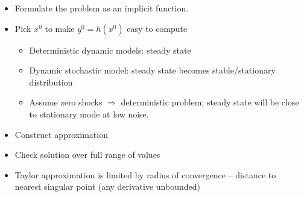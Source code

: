 \documentclass[bigger,handout]{beamer}
\newenvironment{stepitemize}{\begin{itemize}[<+->]}{\end{itemize} }
\begin{document}
\begin{frame}%
 

\begin{stepitemize}
\item Formulate the problem as an implicit function.

\item Pick $x^{0}$ to make $y^{0}=h\left( x^{0}\right) $ easy to compute

\begin{stepitemize}
\item Deterministic dynamic models: steady state

\item Dynamic stochastic model: steady state becomes\newline
stable/stationary distribution

\item Assume zero shocks $\Rightarrow $ deterministic problem;\newline
steady state will be close to stationary mode at low noise.
\end{stepitemize}

\item Construct approximation

\item Check solution over full range of values\bigskip

\item Taylor approximation is limited by radius of convergence -- distance
to nearest singular point (any derivative unbounded)

\end{stepitemize}

 
 
\end{frame}%
\end{document}
